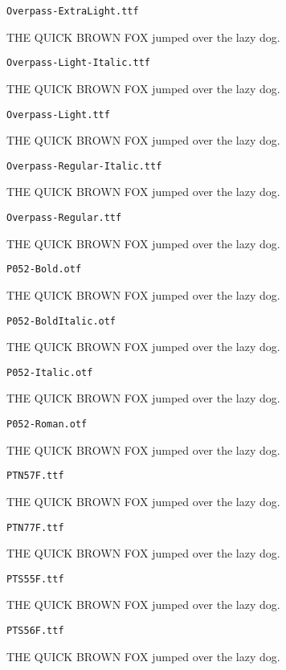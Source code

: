 \documentclass{article}
\begin{document}
\setmainfont[Extension=.ttf]{Overpass-ExtraLight}
\noindent \verb!Overpass-ExtraLight.ttf!

THE QUICK BROWN FOX jumped over the lazy dog.

\setmainfont[Extension=.ttf]{Overpass-Light-Italic}
\noindent \verb!Overpass-Light-Italic.ttf!

THE QUICK BROWN FOX jumped over the lazy dog.

\setmainfont[Extension=.ttf]{Overpass-Light}
\noindent \verb!Overpass-Light.ttf!

THE QUICK BROWN FOX jumped over the lazy dog.

\setmainfont[Extension=.ttf]{Overpass-Regular-Italic}
\noindent \verb!Overpass-Regular-Italic.ttf!

THE QUICK BROWN FOX jumped over the lazy dog.

\setmainfont[Extension=.ttf]{Overpass-Regular}
\noindent \verb!Overpass-Regular.ttf!

THE QUICK BROWN FOX jumped over the lazy dog.

\setmainfont[Extension=.otf]{P052-Bold}
\noindent \verb!P052-Bold.otf!

THE QUICK BROWN FOX jumped over the lazy dog.

\setmainfont[Extension=.otf]{P052-BoldItalic}
\noindent \verb!P052-BoldItalic.otf!

THE QUICK BROWN FOX jumped over the lazy dog.

\setmainfont[Extension=.otf]{P052-Italic}
\noindent \verb!P052-Italic.otf!

THE QUICK BROWN FOX jumped over the lazy dog.

\setmainfont[Extension=.otf]{P052-Roman}
\noindent \verb!P052-Roman.otf!

THE QUICK BROWN FOX jumped over the lazy dog.

\setmainfont[Extension=.ttf]{PTN57F}
\noindent \verb!PTN57F.ttf!

THE QUICK BROWN FOX jumped over the lazy dog.

\setmainfont[Extension=.ttf]{PTN77F}
\noindent \verb!PTN77F.ttf!

THE QUICK BROWN FOX jumped over the lazy dog.

\setmainfont[Extension=.ttf]{PTS55F}
\noindent \verb!PTS55F.ttf!

THE QUICK BROWN FOX jumped over the lazy dog.

\setmainfont[Extension=.ttf]{PTS56F}
\noindent \verb!PTS56F.ttf!

THE QUICK BROWN FOX jumped over the lazy dog.
\end{document}
